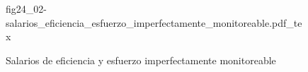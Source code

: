 \begin{figure}[h]
\centering
\def\svgwidth{0.5\textwidth}
{fig24_02-salarios_eficiencia_esfuerzo_imperfectamente_monitoreable.pdf_tex}
\caption{Salarios de eficiencia y esfuerzo imperfectamente monitoreable}
\label{fig24_02-salarios_eficiencia_esfuerzo_imperfectamente_monitoreable}
\end{figure}